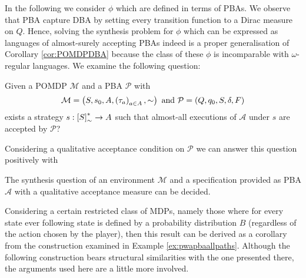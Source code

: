 In the following we consider $\phi$ which are defined in terms of \acp{PBA}. 
We observe that \ac{PBA} capture \ac{DBA} by setting every transition function 
to a Dirac measure on $Q$. Hence, solving the synthesis problem for $\phi$ 
which can be expressed as languages of almost-surely accepting \acp{PBA} indeed 
is a proper generalisation of Corollary \ref{cor:POMDPDBA} because the class of 
these $\phi$ is incomparable with $\omega$-regular languages. We examine the 
following question:
\begin{definition}
  Given a \ac{POMDP} $\mathcal{M}$ and a \ac{PBA} $\mathcal{P}$ with
  \begin{equation*}
    \mathcal{M} = \left(S, s_{0}, A, \left(\tau_{a}\right)_{a\in A}, \sim\right)
  \text{ and }
    \mathcal{P} = \left(Q, q_{0}, S, \delta, F\right)
  \end{equation*}
  exists a strategy $s:\left[S\right]_{\sim}^{*}\rightarrow A$ such that 
  almost-all executions of $\mathcal{A}$ under $s$ are accepted by 
  $\mathcal{P}$?
  \label{def:synthesis}
\end{definition}
Considering a qualitative acceptance condition on $\mathcal{P}$ we can answer
this question positively with
\begin{theorem}
  The synthesis question of an environment $\mathcal{M}$ and a specification
  provided as \ac{PBA} $\mathcal{A}$ with a qualitative acceptance measure
  can be decided.
  \label{thm:pbasynthesis}
\end{theorem}
Considering a certain restricted class of \acp{MDP}, namely those where for 
every state ever following state is defined by a probability distribution $B$
(regardless of the action chosen by the player), then this result can be 
derived as a corollary from the construction examined in Example 
\ref{ex:pwapbaallpaths}. Although the following construction bears structural
similarities with the one presented there, the arguments used here are a little 
more involved.

